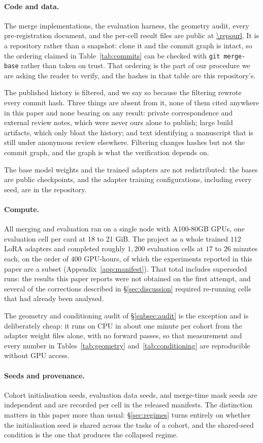 \paragraph{Code and data.} The merge implementations, the evaluation
harness, the geometry audit, every pre-registration document, and the
per-cell result files are public at \url{\repourl}. It is a repository
rather than a snapshot: clone it and the commit graph is intact, so the
ordering claimed in Table~\ref{tab:commits} can be checked with
\texttt{git merge-base} rather than taken on trust. That ordering is the
part of our procedure we are asking the reader to verify, and the hashes in
that table are this repository's.

The published history is filtered, and we say so because the filtering
rewrote every commit hash. Three things are absent from it, none of them
cited anywhere in this paper and none bearing on any result: private
correspondence and external review notes, which were never ours alone to
publish; large build artifacts, which only bloat the history; and text
identifying a manuscript that is still under anonymous review elsewhere.
Filtering changes hashes but not the commit graph, and the graph is what
the verification depends on.

The base model weights and the trained adapters are not redistributed: the
bases are public checkpoints, and the adapter training configurations,
including every seed, are in the repository.

\paragraph{Compute.} All merging and evaluation ran on a single node with
A100-80GB GPUs, one evaluation cell per card at 18 to 21 GiB. The project
as a whole trained $112$ LoRA adapters and completed roughly $1{,}200$
evaluation cells at $17$ to $26$ minutes each, on the order of $400$
GPU-hours, of which the experiments reported in this paper are a subset
(Appendix~\ref{app:manifest}). That total includes superseded runs: the
results this paper reports were not obtained on the first attempt, and
several of the corrections described in \S\ref{sec:discussion} required
re-running cells that had already been analysed.

The geometry and conditioning audit of \S\ref{subsec:audit} is the
exception and is deliberately cheap: it runs on CPU in about one minute
per cohort from the adapter weight files alone, with no forward passes, so
that measurement and every number in Tables~\ref{tab:geometry}
and~\ref{tab:conditioning} are reproducible without GPU access.

\paragraph{Seeds and provenance.} Cohort initialisation seeds, evaluation
data seeds, and merge-time mask seeds are independent and are recorded
per cell in the released manifests. The distinction matters in this paper
more than usual: \S\ref{sec:regimes} turns entirely on whether the
initialisation seed is shared across the tasks of a cohort, and the
shared-seed condition is the one that produces the collapsed regime.
